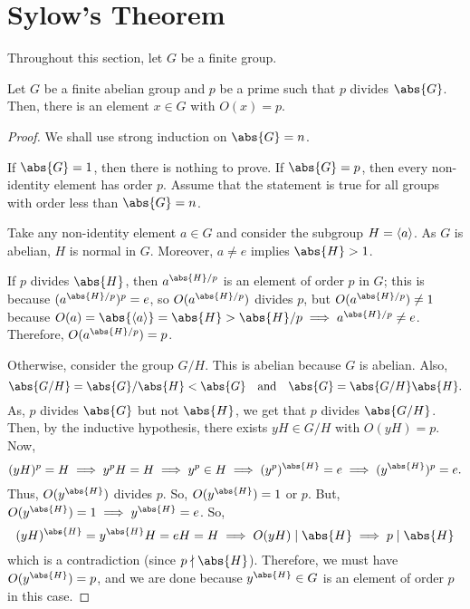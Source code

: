 \documentclass[11pt]{penrose}
\begin{document}

\section{Sylow's Theorem}
Throughout this section, let $G$ be a finite group.

\begin{nthm}[Cauchy]
    Let $G$ be a finite abelian group and $p$ be a prime such that $p$ divides $\abs{G}$. Then, there is an element $x \in G$ with $O(x) = p$.
\end{nthm}
\begin{proof}
    We shall use strong induction on $\abs{G} = n$.

    If $\abs{G} = 1$, then there is nothing to prove. If $\abs{G} = p$, then every non-identity element has order $p$. Assume that the statement is true for all groups with order less than $\abs{G} = n$.

    Take any non-identity element $a \in G$ and consider the subgroup $H = \langle a\rangle$. As $G$ is abelian, $H$ is normal in $G$. Moreover, $a \neq e$ implies $\abs{H} > 1$.

    If $p$ divides $\abs{H}$, then $a^{\abs{H}/p}$ is an element of order $p$ in $G$; this is because $(a^{\abs{H}/p})^{p} = e$, so $O(a^{\abs{H}/p})$ divides $p$, but $O(a^{\abs{H}/p}) \neq 1$ because $O(a) = \abs{\cyclic{a}} = \abs{H} > \abs{H}/p \implies a^{\abs{H}/p} \neq e$. Therefore, $O(a^{\abs{H}/p}) = p$.

    Otherwise, consider the group $G/H$. This is abelian because $G$ is abelian. Also,
    \begin{equation*}
        \abs{G/H} = \abs{G} / \abs{H} < \abs{G}
        \quad\text{and}\quad
        \abs{G} = \abs{G/H} \abs{H}.
    \end{equation*}
    As, $p$ divides $\abs{G}$ but not $\abs{H}$, we get that $p$ divides $\abs{G/H}$. Then, by the inductive hypothesis, there exists $yH \in G/H$ with $O(yH) = p$. Now,
    \begin{equation*}
        (yH)^{p} = H
        \implies
        y^{p} H = H
        \implies
        y^{p} \in H
        \implies
        (y^{p})^{\abs{H}} = e
        \implies
        (y^{\abs{H}})^{p} = e.
    \end{equation*}
    Thus, $O(y^{\abs{H}})$ divides $p$. So, $O(y^{\abs{H}}) = 1$ or $p$. But, $O(y^{\abs{H}}) = 1 \implies y^{\abs{H}} = e$. So,
    \begin{equation*}
        (yH)^{\abs{H}} = y^{\abs{H}}H = eH = H
        \implies
        O(yH) \mid \abs{H}
        \implies
        p \mid \abs{H}
    \end{equation*}
    which is a contradiction (since $p \nmid \abs{H}$). Therefore, we must have $O(y^{\abs{H}}) = p$, and we are done because $y^{\abs{H}} \in G$ is an element of order $p$ in this case.
\end{proof}
\end{document}
